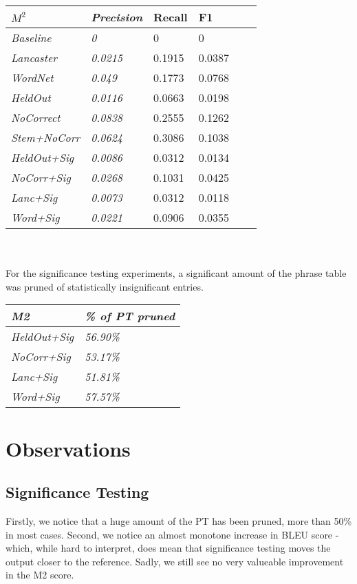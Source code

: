 \documentclass[11pt,letterpaper]{article}
\begin{document}
\begin{tabular}{ |l|l|l|l|l|l| }
\hline
\textit{$M^2$} & \textit{Precision} & Recall & F1 \\ \hline
\textit{Baseline} & \textit{0} & 0 & 0 \\ \hline
\textit{Lancaster} & \textit{0.0215} & 0.1915 & 0.0387 \\ \hline
\textit{WordNet} & \textit{0.049} & 0.1773 & 0.0768 \\ \hline
\textit{HeldOut} & \textit{0.0116} & 0.0663 & 0.0198 \\ \hline
\textit{NoCorrect} & \textit{0.0838} & 0.2555 & 0.1262 \\ \hline
\textit{Stem+NoCorr} & \textit{0.0624} & 0.3086 & 0.1038 \\ \hline
\textit{HeldOut+Sig} & \textit{0.0086} & 0.0312 & 0.0134 \\ \hline
\textit{NoCorr+Sig} & \textit{0.0268} & 0.1031 & 0.0425 \\ \hline
\textit{Lanc+Sig} & \textit{0.0073} & 0.0312 & 0.0118 \\ \hline
\textit{Word+Sig} & \textit{0.0221} & 0.0906 & 0.0355 \\ \hline
\end{tabular}
\\\\

For the significance testing experiments, a significant amount of the phrase table was pruned of statistically insignificant entries. \\

\begin{tabular}{|l|l|}
\hline
\textit{M2} & \textit{\% of PT pruned} \\ \hline
\textit{HeldOut+Sig} & \textit{56.90\%} \\ \hline
\textit{NoCorr+Sig} & \textit{53.17\%} \\ \hline
\textit{Lanc+Sig} & \textit{51.81\%} \\ \hline
\textit{Word+Sig} & \textit{57.57\%} \\ \hline
\end{tabular}

\section{Observations}

\subsection{Significance Testing}
\indent Firstly, we notice that a huge amount of the PT has been pruned, more than 50\% in most cases. Second, we notice an 
almost monotone increase in BLEU score - which, while hard to interpret, does mean that significance testing moves the 
output closer to the reference. Sadly, we still see no very valueable improvement in the M2 score. \newline
\end{document}
